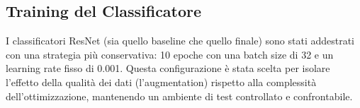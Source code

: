 \subsection{Training del Classificatore}

I classificatori ResNet (sia quello baseline che quello finale) sono stati addestrati con una strategia più conservativa: 10 epoche con una batch size di 32 e un learning rate fisso di 0.001. Questa configurazione è stata scelta per isolare l'effetto della qualità dei dati (l'augmentation) rispetto alla complessità dell'ottimizzazione, mantenendo un ambiente di test controllato e confrontabile.